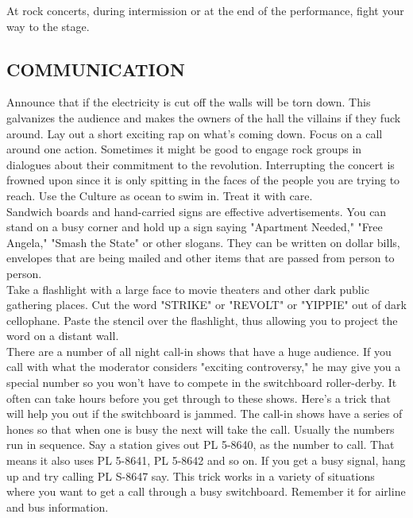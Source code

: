 \documentclass[11pt,twoside,a4paper]{book}
\begin{document}
At rock concerts, during intermission or at the end of the performance, fight your way to the stage.

\subsection{COMMUNICATION}

Announce that if the electricity is cut off the walls will be torn down. This galvanizes the audience and makes the owners of the hall the villains if they fuck around. Lay out a short exciting rap on what's coming down. Focus on a call around one action. Sometimes it might be good to engage rock groups in dialogues about their commitment to the revolution. Interrupting the concert is frowned upon since it is only spitting in the faces of the people you are trying to reach. Use the Culture as ocean to swim in. Treat it with care.~\\

Sandwich boards and hand-carried signs are effective advertisements. You can stand on a busy corner and hold up a sign saying "Apartment Needed," "Free Angela," "Smash the State" or other slogans. They can be written on dollar bills, envelopes that are being mailed and other items that are passed from person to person.~\\

Take a flashlight with a large face to movie theaters and other dark public gathering places. Cut the word "STRIKE" or "REVOLT" or "YIPPIE" out of dark cellophane. Paste the stencil over the flashlight, thus allowing you to project the word on a distant wall.~\\

There are a number of all night call-in shows that have  a huge audience. If you call with what the moderator considers "exciting controversy," he may give you a special number so you won't have to compete in the switchboard roller-derby. It often can take hours before you get through to these shows. Here's a trick that will help you out if the switchboard is jammed. The call-in shows have a series of hones so that when one is busy the next will take the call. Usually the numbers run in sequence. Say a station gives out PL 5-8640, as the number to call. That means it also uses PL 5-8641, PL 5-8642 and so on. If you get a busy signal, hang up and try calling PL S-8647 say. This trick works in a variety of situations where you want to get a call through a busy switchboard. Remember it for airline and bus information.
\end{document}
